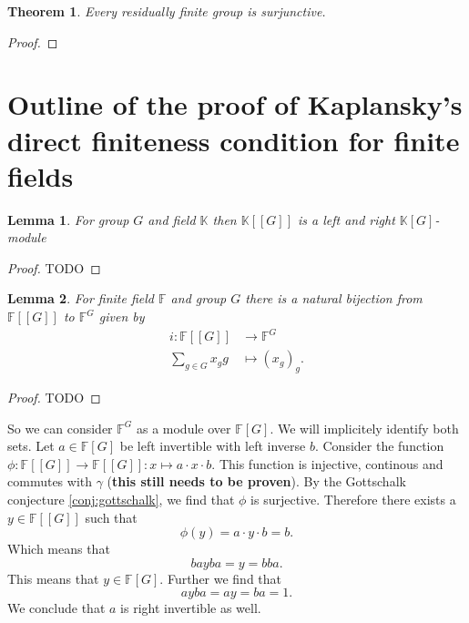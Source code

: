 \documentclass[a4paper]{report}
\newcommand{\F}{\mathbb{F}}
\newtheorem{theorem}{Theorem}
\newtheorem{lemma}{Lemma}
\begin{document}
    \begin{theorem} \label{thm:res_fin_surjunctive}
    Every residually finite group is surjunctive.
    \end{theorem}
    \begin{proof}
    
    \end{proof}


	\section{Outline of the proof of Kaplansky's direct finiteness condition for finite fields}

	\begin{lemma}
		For group $G$ and field $\mathbb K$ then $\mathbb{K}[[G]]$ is a left and right $\mathbb{K}[G]$-module
	\end{lemma}
	\begin{proof}
		TODO
	\end{proof}
	\begin{lemma}
		For finite field $\F$ and group $G$ there is a natural bijection from $\F[[G]]$ to $\F^{G}$ given by \begin{align*}
			i: \F[[G]] &\longrightarrow \F^{G} \\
			\sum_{g \in G}^{ } x_{g}g &\longmapsto (x_g)_g
		.\end{align*}
	\end{lemma}
	\begin{proof}
		TODO
	\end{proof}
	So we can consider $\F^G$ as a module over $\F[G]$. We will implicitely identify both sets.
	Let $a\in \F[G]$ be left invertible with left inverse $b$. Consider the function $\phi: \F[[G]] \to \F[[G]]: x \mapsto a\cdot x \cdot b$. This function is injective, continous and commutes with $\gamma$ (\textbf{this still needs to be proven}).
	By the Gottschalk conjecture \ref{conj:gottschalk}, we find that $\phi$ is surjective. Therefore there exists a $y \in \F[[G]]$ such that \[
		\phi(y) = a \cdot y \cdot b = b
	.\] 
	Which means that  \[
	b a y b a = y =b b a
	.\] 
	This means that $y \in \F[G]$. Further we find that \[
		a y b a = a y  = b a = 1
.\] We conclude that $a$ is right invertible as well. 
	\printbibliography
\end{document}
